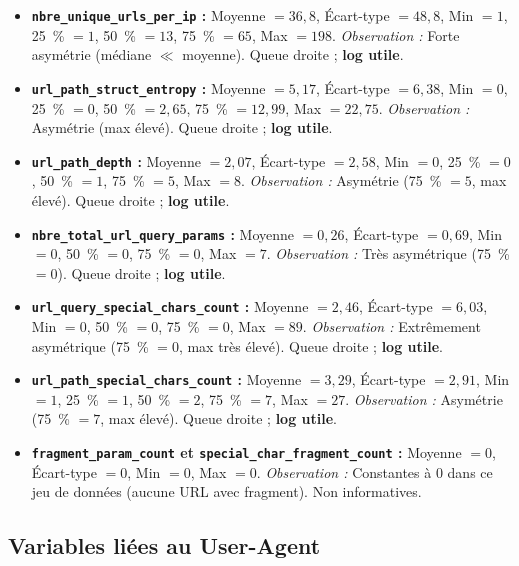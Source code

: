 \documentclass[a4paper,12pt]{article}
\begin{document}
\begin{itemize}
  \item \textbf{\texttt{nbre\_unique\_urls\_per\_ip} :} Moyenne $= 36{,}8$, Écart-type $= 48{,}8$, Min $= 1$, 25~\% $= 1$, 50~\% $= 13$, 75~\% $= 65$, Max $= 198$. \emph{Observation :} Forte asymétrie (médiane $\ll$ moyenne). Queue droite ; \textbf{log utile}.
  \item \textbf{\texttt{url\_path\_struct\_entropy} :} Moyenne $= 5{,}17$, Écart-type $= 6{,}38$, Min $= 0$, 25~\% $= 0$, 50~\% $= 2{,}65$, 75~\% $= 12{,}99$, Max $= 22{,}75$. \emph{Observation :} Asymétrie (max élevé). Queue droite ; \textbf{log utile}.
  \item \textbf{\texttt{url\_path\_depth} :} Moyenne $= 2{,}07$, Écart-type $= 2{,}58$, Min $= 0$, 25~\% $= 0$, 50~\% $= 1$, 75~\% $= 5$, Max $= 8$. \emph{Observation :} Asymétrie (75~\% $= 5$, max élevé). Queue droite ; \textbf{log utile}.
  \item \textbf{\texttt{nbre\_total\_url\_query\_params} :} Moyenne $= 0{,}26$, Écart-type $= 0{,}69$, Min $= 0$, 50~\% $= 0$, 75~\% $= 0$, Max $= 7$. \emph{Observation :} Très asymétrique (75~\% $= 0$). Queue droite ; \textbf{log utile}.
  \item \textbf{\texttt{url\_query\_special\_chars\_count} :} Moyenne $= 2{,}46$, Écart-type $= 6{,}03$, Min $= 0$, 50~\% $= 0$, 75~\% $= 0$, Max $= 89$. \emph{Observation :} Extrêmement asymétrique (75~\% $= 0$, max très élevé). Queue droite ; \textbf{log utile}.
  \item \textbf{\texttt{url\_path\_special\_chars\_count} :} Moyenne $= 3{,}29$, Écart-type $= 2{,}91$, Min $= 1$, 25~\% $= 1$, 50~\% $= 2$, 75~\% $= 7$, Max $= 27$. \emph{Observation :} Asymétrie (75~\% $= 7$, max élevé). Queue droite ; \textbf{log utile}.
  \item \textbf{\texttt{fragment\_param\_count} et \texttt{special\_char\_fragment\_count} :} Moyenne $= 0$, Écart-type $= 0$, Min $= 0$, Max $= 0$. \emph{Observation :} Constantes à 0 dans ce jeu de données (aucune URL avec fragment). Non informatives.
\end{itemize}

\subsection{Variables liées au User-Agent}
\end{document}

